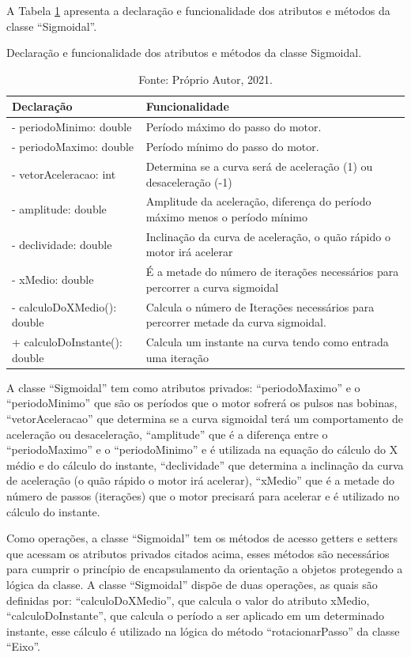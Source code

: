 A Tabela \ref{tab:classesigmoidal} apresenta a declaração e funcionalidade dos atributos e métodos 
da classe “Sigmoidal”.

\begin{table}[!htb]
    \centering
    \caption{Declaração e funcionalidade dos atributos e métodos da classe Sigmoidal.}
    \begin{tabular}{lp{9cm}}
        \hline
        \textbf{Declaração} & \textbf{Funcionalidade}\\
        \hline
        - periodoMinimo: double & Período máximo do passo do motor.\\
        - periodoMaximo: double & Período mínimo do passo do motor.\\
        - vetorAceleracao: int & Determina se a curva será de aceleração (1) ou desaceleração (-1)\\
        - amplitude: double & Amplitude da aceleração, diferença do período máximo menos o período mínimo\\
        - declividade: double & Inclinação da curva de aceleração, o quão rápido o motor irá acelerar\\
        - xMedio: double & É a metade do número de iterações necessários para percorrer a curva sigmoidal\\
        - calculoDoXMedio(): double & Calcula o número de Iterações necessários para percorrer metade da curva sigmoidal.\\
        + calculoDoInstante(): double & Calcula um instante na curva tendo como entrada uma iteração\\
        \hline       
    \end{tabular}
    \caption*{Fonte: Próprio Autor, 2021.}
    \label{tab:classesigmoidal}
\end{table}

A classe “Sigmoidal” tem como atributos privados: “periodoMaximo” e o “periodoMinimo” que são os períodos 
que o motor sofrerá os pulsos nas bobinas, “vetorAceleracao” que determina se a curva sigmoidal terá 
um comportamento de aceleração ou desaceleração, “amplitude” que é a diferença entre o “periodoMaximo” 
e o “periodoMinimo” e é utilizada na equação do cálculo do X médio e do cálculo do instante, “declividade” 
que determina a inclinação da curva de aceleração (o quão rápido o motor irá acelerar), “xMedio” que é a 
metade do número de passos (iterações) que o motor precisará para acelerar e é utilizado no cálculo 
do instante. 

Como operações, a classe “Sigmoidal” tem os métodos de acesso getters e setters que acessam os atributos 
privados citados acima, esses métodos são necessários para cumprir o princípio de encapsulamento da orientação 
a objetos protegendo a lógica da classe. A classe “Sigmoidal” dispõe de duas operações, as quais são definidas 
por: “calculoDoXMedio”, que calcula o valor do atributo xMedio, “calculoDoInstante”, que calcula o período a 
ser aplicado em um determinado instante, esse cálculo é utilizado na lógica do método “rotacionarPasso” 
da classe “Eixo”.

